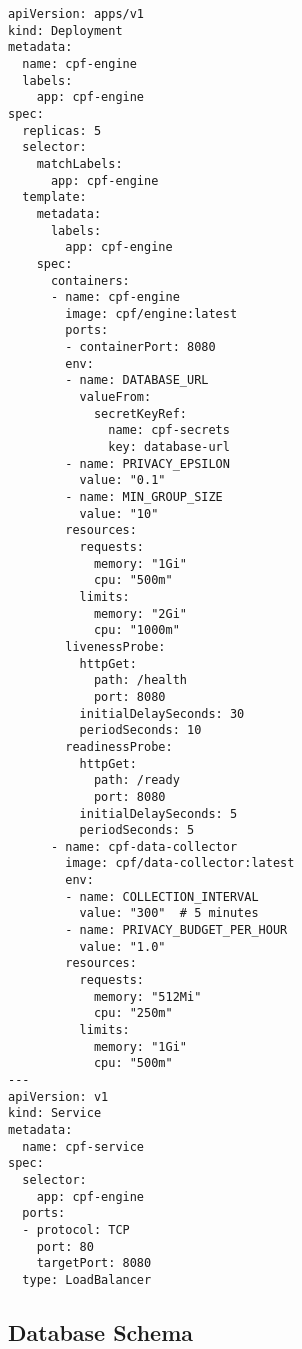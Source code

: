 \documentclass[10pt,twocolumn]{IEEEtran}
\begin{document}
\begin{lstlisting}[caption={CPF Kubernetes Deployment Configuration}]
apiVersion: apps/v1
kind: Deployment
metadata:
  name: cpf-engine
  labels:
    app: cpf-engine
spec:
  replicas: 5
  selector:
    matchLabels:
      app: cpf-engine
  template:
    metadata:
      labels:
        app: cpf-engine
    spec:
      containers:
      - name: cpf-engine
        image: cpf/engine:latest
        ports:
        - containerPort: 8080
        env:
        - name: DATABASE_URL
          valueFrom:
            secretKeyRef:
              name: cpf-secrets
              key: database-url
        - name: PRIVACY_EPSILON
          value: "0.1"
        - name: MIN_GROUP_SIZE
          value: "10"
        resources:
          requests:
            memory: "1Gi"
            cpu: "500m"
          limits:
            memory: "2Gi"
            cpu: "1000m"
        livenessProbe:
          httpGet:
            path: /health
            port: 8080
          initialDelaySeconds: 30
          periodSeconds: 10
        readinessProbe:
          httpGet:
            path: /ready
            port: 8080
          initialDelaySeconds: 5
          periodSeconds: 5
      - name: cpf-data-collector
        image: cpf/data-collector:latest
        env:
        - name: COLLECTION_INTERVAL
          value: "300"  # 5 minutes
        - name: PRIVACY_BUDGET_PER_HOUR
          value: "1.0"
        resources:
          requests:
            memory: "512Mi"
            cpu: "250m"
          limits:
            memory: "1Gi"
            cpu: "500m"
---
apiVersion: v1
kind: Service
metadata:
  name: cpf-service
spec:
  selector:
    app: cpf-engine
  ports:
  - protocol: TCP
    port: 80
    targetPort: 8080
  type: LoadBalancer
\end{lstlisting}

\subsection{Database Schema}
\end{document}
